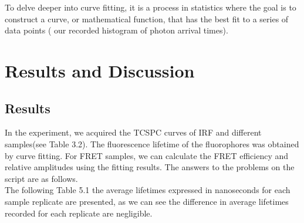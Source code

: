 \documentclass[a4paper,english,12pt,bibliography=totoc]{scrreprt}
\begin{document}
To delve deeper into curve fitting, it is a process in statistics where the goal is to construct a curve, or mathematical function, that has the best fit to a series of data points ( our recorded histogram of photon arrival times).





\chapter{Results and Discussion}
\label{cha:ResultsandDiscussion}

\section{Results}
\label{sec:Results} 

In the experiment, we acquired the TCSPC curves of IRF and different samples(see Table 3.2). The fluorescence lifetime of the fluorophores was obtained by curve fitting. For FRET samples, we can calculate the FRET efficiency and relative amplitudes using the fitting results. The answers to the problems on the script are as follows.\\

The following Table 5.1 the average lifetimes expressed in nanoseconds for each sample replicate are presented, as we can see the difference in average lifetimes recorded for each replicate are negligible.
\end{document}
